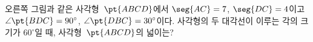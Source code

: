 \noindent\begin{minipage}[t]{0.58\linewidth}\vspace{0pt}\raggedright 오른쪽 그림과 같은 사각형~$\pt{ABCD}$에서 $\seg{AC}=7$, $\seg{DC}=4$이고 $\angle\pt{BDC}=90^\circ$, $\angle\pt{DBC}=30^\circ$이다. 사각형의 두 대각선이 이루는 각의 크기가 $60^\circ$일 때, 사각형~$\pt{ABCD}$의 넓이는?\end{minipage}\hfill\begin{minipage}[t]{0.4\linewidth}\vspace{0pt}\centering \resizebox{\ifdim\width>\linewidth\linewidth\else\width\fi}{!}{}\end{minipage}\par
{}

